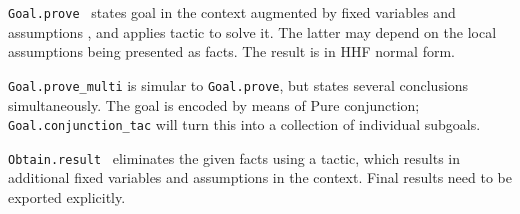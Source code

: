 \begin{isabellebody}
\begin{isamarkuptext}
\begin{description}
  \item \verb|Goal.prove|~ states goal  in the context augmented by fixed variables  and
  assumptions , and applies tactic  to solve
  it.  The latter may depend on the local assumptions being presented
  as facts.  The result is in HHF normal form.

  \item \verb|Goal.prove_multi| is simular to \verb|Goal.prove|, but
  states several conclusions simultaneously.  The goal is encoded by
  means of Pure conjunction; \verb|Goal.conjunction_tac| will turn this
  into a collection of individual subgoals.

  \item \verb|Obtain.result|~ eliminates the
  given facts using a tactic, which results in additional fixed
  variables and assumptions in the context.  Final results need to be
  exported explicitly.

  \end{description}%
\end{isamarkuptext}%
\isamarkuptrue%
%
\endisatagmlref
{\isafoldmlref}%
%
\isadelimmlref
%
\endisadelimmlref
%
\isadelimtheory
%
\endisadelimtheory
%
\isatagtheory
{}\isamarkupfalse%
%
\endisatagtheory
{\isafoldtheory}%
%
\isadelimtheory
%
\endisadelimtheory
\isanewline
\end{isabellebody}%
